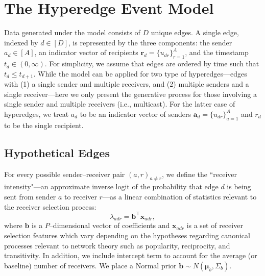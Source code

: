 \documentclass[ba]{imsart}
\numberwithin{equation}{section}
\theoremstyle{plain}
\begin{document}
\section{The Hyperedge Event Model}\label{sec:generative process}

Data generated under the model consists of $D$ unique edges. A single edge, indexed by $d \in [D]$, is represented by the three components: the sender $a_d \in [A]$, an indicator vector of recipients $\boldsymbol{r}_d = \{u_{dr} \}_{r=1}^{A}$, and the timestamp $t_d \in (0, \infty)$. For simplicity, we assume that edges are ordered by time such that $t_d \leq t_{d+1}$. While the model can be applied for two type of hyperedges---edges with (1) a single sender and multiple receivers, and (2) multiple senders and a single receiver---here we only present the generative process for those involving a single sender and multiple receivers (i.e., multicast). For the latter case of hyperedges, we treat $a_d$ to be an indicator vector of senders $\boldsymbol{a}_d = \{u_{dr} \}_{a=1}^{A}$ and $r_d$ to be the single recipient.

\subsection{Hypothetical Edges}\label{subsec: Tie}
For every possible sender--receiver pair $(a,r)_{a \neq r}$, we define the ``receiver intensity"---an approximate inverse logit of the probability that edge $d$ is being sent from sender $a$ to receiver $r$---as a linear combination of statistics relevant to the receiver selection process:
\begin{equation}
\lambda_{adr} = {\boldsymbol{b}}^{\top}\boldsymbol{x}_{adr},
\end{equation}
where $\boldsymbol{b}$ is a $P$--dimensional vector of coefficients and $\boldsymbol{x}_{adr}$ is a set of receiver selection features which vary depending on the hypotheses regarding canonical processes relevant to network theory such as popularity, reciprocity, and transitivity. In addition, we include intercept term to account for the average (or baseline) number of receivers. We place a Normal prior $\boldsymbol{b} \sim N(\boldsymbol{\mu}_b, \Sigma_b)$.
\end{document}
